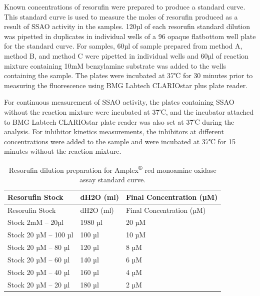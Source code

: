 \documentclass[
  letterpaper,
  DIV=11,
  numbers=noendperiod]{scrreprt}
\begin{document}
Known concentrations of resorufin were prepared to produce a standard
curve. This standard curve is used to measure the moles of resorufin
produced as a result of SSAO activity in the samples. 120µl of each
resorufin standard dilution was pipetted in duplicates in individual
wells of a 96 opaque flatbottom well plate for the standard curve. For
samples, 60µl of sample prepared from method A, method B, and method C
were pipetted in individual wells and 60µl of reaction mixture
containing 10mM benzylamine substrate was added to the wells containing
the sample. The plates were incubated at 37℃ for 30 minutes prior to
measuring the fluorescence using BMG Labtech CLARIOstar plus plate
reader.

For continuous measurement of SSAO activity, the plates containing SSAO
without the reaction mixture were incubated at 37℃, and the incubator
attached to BMG Labtech CLARIOstar plate reader was also set at 37℃
during the analysis. For inhibitor kinetics measurements, the inhibitors
at different concentrations were added to the sample and were incubated
at 37℃ for 15 minutes without the reaction mixture.

\begin{longtable}[]{@{}lll@{}}
\caption{Resorufin dilution preparation for Amplex\textsuperscript{®}
red monoamine oxidase assay standard
curve.}\label{tbl-resorufin-soln-prep}\tabularnewline
\toprule\noalign{}
Resorufin Stock & dH2O (ml) & Final Concentration (µM) \\
\midrule\noalign{}
\endfirsthead
\toprule\noalign{}
Resorufin Stock & dH2O (ml) & Final Concentration (µM) \\
\midrule\noalign{}
\endhead
\bottomrule\noalign{}
\endlastfoot
Stock 2mM -- 20µl & 1980 µl & 20 µM \\
Stock 20 µM -- 100 µl & 100 µl & 10 µM \\
Stock 20 µM -- 80 µl & 120 µl & 8 µM \\
Stock 20 µM -- 60 µl & 140 µl & 6 µM \\
Stock 20 µM -- 40 µl & 160 µl & 4 µM \\
Stock 20 µM -- 20 µl & 180 µl & 2 µM \\
\end{longtable}
\end{document}
